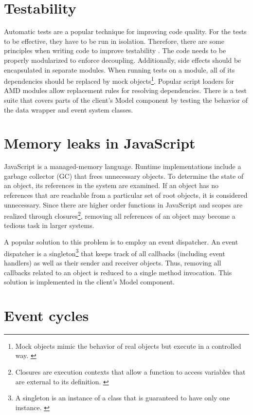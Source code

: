 \section{Testability}
Automatic tests are a popular technique for improving code quality. For the tests to be effective, they have to be run in isolation. Therefore, there are some principles when writing code to improve testability \cite{Trostler_2013}. The code needs to be properly modularized to enforce decoupling. Additionally, side effects should be encapsulated in separate modules. When running tests on a module, all of its dependencies should be replaced by mock objects\footnote{Mock objects mimic the behavior of real objects but execute in a controlled way. \cite{Osherove_2009}}. Popular script loaders for AMD modules allow replacement rules for resolving dependencies. There is a test suite that covers parts of the client's Model component by testing the behavior of the data wrapper and event system classes.

\section{Memory leaks in JavaScript}
JavaScript is a managed-memory language. Runtime implementations include a garbage collector (GC) that frees unnecessary objects. To determine the state of an object, its references in the system are examined. If an object has no references that are reachable from a particular set of root objects, it is considered unnecessary. Since there are higher order functions in JavaScript and scopes are realized through closures\footnote{Closures are execution contexts that allow a function to access variables that are external to its definition. \cite{Resig_2013}}, removing all references of an object may become a tedious task in larger systems. 

A popular solution to this problem is to employ an event dispatcher. An event dispatcher is a singleton\footnote{A singleton is an instance of a class that is guaranteed to have only one instance. \cite{Gamma_1994}} that keeps track of all callbacks (including event handlers) as well as their sender and receiver objects. Thus, removing all callbacks related to an object is reduced to a single method invocation. This solution is implemented in the client's Model component.


\section{Event cycles}

